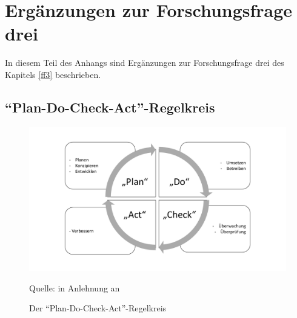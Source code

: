 \chapter{Ergänzungen zur Forschungsfrage drei} \label{appendixFF3}
In diesem Teil des Anhangs sind Ergänzungen zur Forschungsfrage drei des Kapitels \vref{ff3} beschrieben.

\section{\enquote{Plan-Do-Check-Act}-Regelkreis}

\begin{figure}[H]
	\centering
	\includegraphics[scale=0.51]{img/planDoCheckAct.pdf}
	\caption{Der \enquote{Plan-Do-Check-Act}-Regelkreis}
	{\footnotesize Quelle: in Anlehnung an \cite[][S.12]{kersten_it-sicherheitsmanagement_2020}}
	\label{abb:planDoCheckAct}
\end{figure}

\clearpage %
